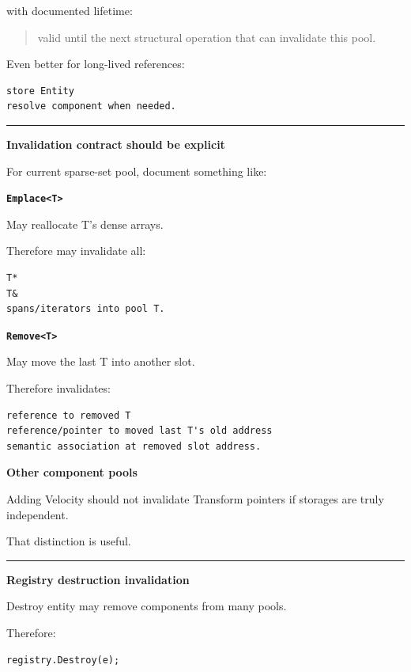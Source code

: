 with documented lifetime:

\begin{quote}
valid until the next structural operation that can invalidate this pool.
\end{quote}

Even better for long-lived references:

\begin{verbatim}
store Entity
resolve component when needed.
\end{verbatim}

\begin{center}\rule{0.5\linewidth}{0.5pt}\end{center}

\textbf{Invalidation contract should be explicit}

For current sparse-set pool, document something like:

\textbf{\texttt{Emplace\textless{}T\textgreater{}}}

May reallocate T's dense arrays.

Therefore may invalidate all:

\begin{verbatim}
T*
T&
spans/iterators into pool T.
\end{verbatim}

\textbf{\texttt{Remove\textless{}T\textgreater{}}}

May move the last T into another slot.

Therefore invalidates:

\begin{verbatim}
reference to removed T
reference/pointer to moved last T's old address
semantic association at removed slot address.
\end{verbatim}

\textbf{Other component pools}

Adding Velocity should not invalidate Transform pointers if storages are truly independent.

That distinction is useful.

\begin{center}\rule{0.5\linewidth}{0.5pt}\end{center}

\textbf{Registry destruction invalidation}

Destroy entity may remove components from many pools.

Therefore:

\begin{verbatim}
registry.Destroy(e);
\end{verbatim}

